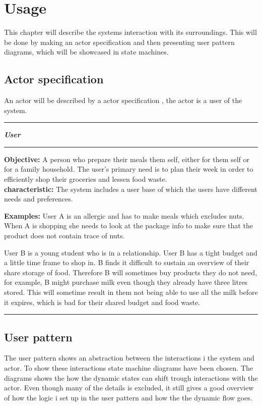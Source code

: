 \chapter{Usage}\label{Usage}
This chapter will describe the systems interaction with its surroundings. This will be done by making an actor specification and then presenting user pattern diagrams, which will be showcased in state machines.

\section{Actor specification}
\label{Actor_specification}
An actor will be described by a actor specification , the actor is a user of the system.

\hrule
\begin{tightcenter}
\textit{\textbf{User}}
\end{tightcenter}
\hrule
\textbf{Objective:} A person who prepare their meals them self, either for them self or for a family household. The user's primary need is to plan their week in order to efficiently shop their groceries and lessen food waste.\\

\textbf{characteristic:} The system includes a user base of which the users have different needs and preferences.

\textbf{Examples:} User A is an allergic and has to make meals which excludes nuts. When A is shopping she needs to look at the package info to make sure that the product does not contain trace of nuts.

User B is a young student who is in a relationship. User B has a tight budget and a little time frame to shop in. B finds it difficult to sustain an overview of their share storage of food. Therefore B will sometimes buy products they do not need, for example, B might purchase milk even though they already have three litres stored. This will sometime result in them not being able to use all the milk before it expires, which is bad for their shared budget and food waste.
\hrule



\section{User pattern}
The user pattern shows an abstraction between the interactions i the system and actor. To show these interactions state machine diagrams have been chosen. The diagrams shows the how the dynamic states can shift trough interactions with the actor. Even though many of the details is excluded, it still gives a good overview of how the logic i set up in the user pattern and how the the dynamic flow goes. 

